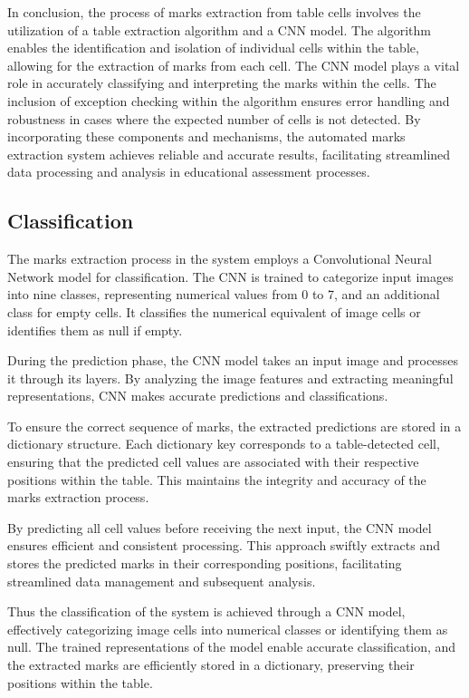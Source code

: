 \noindent In conclusion, the process of marks extraction from table cells involves the utilization of a table extraction algorithm and a CNN model. The algorithm enables the identification and isolation of individual cells within the table, allowing for the extraction of marks from each cell. The CNN model plays a vital role in accurately classifying and interpreting the marks within the cells. The inclusion of exception checking within the algorithm ensures error handling and robustness in cases where the expected number of cells is not detected. By incorporating these components and mechanisms, the automated marks extraction system achieves reliable and accurate results, facilitating streamlined data processing and analysis in educational assessment processes.

\subsection{Classification}

\noindent The marks extraction process in the system employs a Convolutional Neural Network model for classification. The CNN is trained to categorize input images into nine classes, representing numerical values from 0 to 7, and an additional class for empty cells. It classifies the numerical equivalent of image cells or identifies them as null if empty.

\clearpage

\noindent During the prediction phase, the CNN model takes an input image and processes it through its layers. By analyzing the image features and extracting meaningful representations, CNN makes accurate predictions and classifications.

\noindent To ensure the correct sequence of marks, the extracted predictions are stored in a dictionary structure. Each dictionary key corresponds to a table-detected cell, ensuring that the predicted cell values are associated with their respective positions within the table. This maintains the integrity and accuracy of the marks extraction process.

\noindent By predicting all cell values before receiving the next input, the CNN model ensures efficient and consistent processing. This approach swiftly extracts and stores the predicted marks in their corresponding positions, facilitating streamlined data management and subsequent analysis.

\noindent  Thus the classification of the system is achieved through a CNN model, effectively categorizing image cells into numerical classes or identifying them as null. The trained representations of the model enable accurate classification, and the extracted marks are efficiently stored in a dictionary, preserving their positions within the table. 

